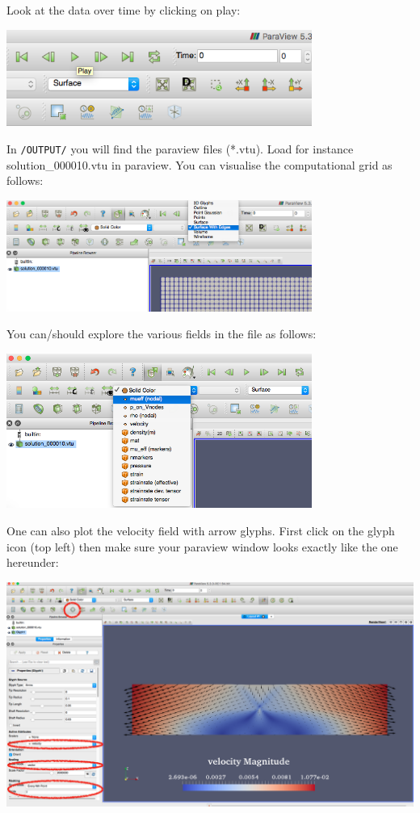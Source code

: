 \documentclass[a4paper]{article}
\begin{document}
Look at the data over time by clicking on play:
\begin{center}
\includegraphics[width=10cm]{images/parav3}
\end{center}

In {\tt /OUTPUT/} you will find the paraview files (*.vtu). Load for instance solution\_000010.vtu in paraview. You can visualise the computational grid as follows:
\begin{center}
\includegraphics[width=10cm]{images/visugrid}
\end{center}

You can/should explore the various fields in the file as follows:

\begin{center}
\includegraphics[width=10cm]{images/visugrid2}
\end{center}

One can also plot the velocity field with arrow glyphs. First click on the glyph icon (top left) then make sure your paraview window looks exactly like the one hereunder:

\begin{center}
\includegraphics[width=16cm]{images/visuarrows}
\end{center}
\end{document}
